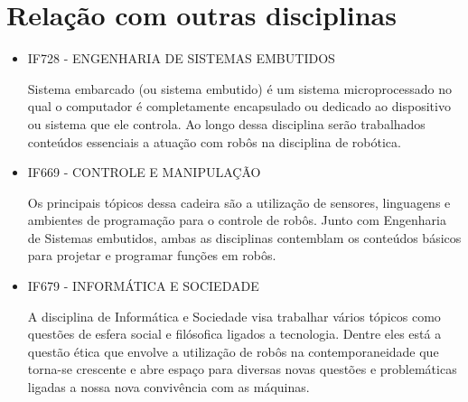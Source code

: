 \documentclass[a4paper, 12pt]{article}
\begin{document}
\section{Relação com outras disciplinas}
    \par
    \begin{itemize}
        \item IF728 - ENGENHARIA DE SISTEMAS EMBUTIDOS
            \par 
             Sistema embarcado (ou sistema embutido) é um sistema microprocessado no qual o computador é completamente encapsulado ou dedicado ao dispositivo ou sistema que ele controla. Ao longo dessa disciplina serão trabalhados conteúdos essenciais a atuação com robôs na disciplina de robótica. \cite{sitecinHFC}
        \item IF669 - CONTROLE E MANIPULAÇÃO
            \par
            Os principais tópicos dessa cadeira são a utilização de sensores, linguagens e ambientes de programação para o controle de robôs. Junto com Engenharia de Sistemas embutidos, ambas as disciplinas contemblam os conteúdos básicos para projetar e programar funções em robôs.\cite{sitecinHFC}
        \item IF679 - INFORMÁTICA E SOCIEDADE
            \par 
            A disciplina de Informática e Sociedade visa trabalhar vários tópicos como questões de esfera social e filósofica ligados a tecnologia. Dentre eles está a questão ética que envolve a utilização de robôs na contemporaneidade que torna-se crescente e abre espaço para diversas novas questões e problemáticas ligadas a nossa nova convivência com as máquinas. \cite{sitecinHFC}
    \end{itemize}

\printbibliography
\end{document}
